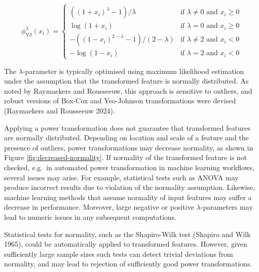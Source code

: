 \documentclass[preprint,12pt,authoryear]{elsarticle}
\begin{document}
\begin{equation}
\label{eqn:yeo-johnson-original}
\phi_{\text{YJ}}^\lambda (x_i) = 
\begin{cases}
\left( \left( 1 + x_i \right)^\lambda - 1\right) / \lambda & \text{if } \lambda \neq 0 \text{ and } x_i \geq 0\\
\log(1 + x_i) & \text{if } \lambda = 0 \text{ and } x_i \geq 0\\
-\left( \left( 1 - x_i\right)^{2 - \lambda} - 1 \right) / \left(2 - \lambda \right) & \text{if } \lambda \neq 2 \text{ and } x_i < 0\\
-\log(1 - x_i) & \text{if } \lambda = 2 \text{ and } x_i < 0
\end{cases}
\end{equation}

The \(\lambda\)-parameter is typically optimised using maximum
likelihood estimation under the assumption that the transformed feature
is normally distributed. As noted by Raymaekers and Rousseeuw, this
approach is sensitive to outliers, and robust versions of Box-Cox and
Yeo-Johnson transformations were devised (Raymaekers and Rousseeuw
2024).

Applying a power transformation does not guarantee that transformed
features are normally distributed. Depending on location and scale of a
feature and the presence of outliers, power transformations may decrease
normality, as shown in Figure \ref{fig:decreased-normality}. If
normality of the transformed feature is not checked, e.g.~in automated
power transformation in machine learning workflows, several issues may
arise. For example, statistical tests such as ANOVA may produce
incorrect results due to violation of the normality assumption.
Likewise, machine learning methods that assume normality of input
features may suffer a decrease in performance. Moreover, large negative
or positive \(\lambda\)-parameters may lead to numeric issues in any
subsequent computations.

Statistical tests for normality, such as the Shapiro-Wilk test (Shapiro
and Wilk 1965), could be automatically applied to transformed features.
However, given sufficiently large sample sizes such tests can detect
trivial deviations from normality, and may lead to rejection of
sufficiently good power transformations.
\end{document}
